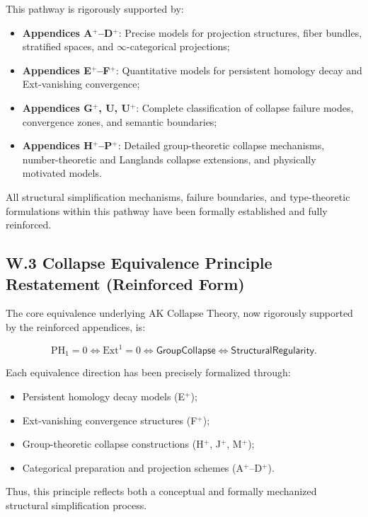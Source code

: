 \documentclass[11pt]{article}
\begin{document}
This pathway is rigorously supported by:

\begin{itemize}
    \item \textbf{Appendices A$^{+}$–D$^{+}$}: Precise models for projection structures, fiber bundles, stratified spaces, and $\infty$-categorical projections;
    \item \textbf{Appendices E$^{+}$–F$^{+}$}: Quantitative models for persistent homology decay and Ext-vanishing convergence;
    \item \textbf{Appendices G$^{+}$, U, U$^{+}$}: Complete classification of collapse failure modes, convergence zones, and semantic boundaries;
    \item \textbf{Appendices H$^{+}$–P$^{+}$}: Detailed group-theoretic collapse mechanisms, number-theoretic and Langlands collapse extensions, and physically motivated models.
\end{itemize}

All structural simplification mechanisms, failure boundaries, and type-theoretic formulations within this pathway have been formally established and fully reinforced.

\subsection*{W.3 Collapse Equivalence Principle Restatement (Reinforced Form)}

The core equivalence underlying AK Collapse Theory, now rigorously supported by the reinforced appendices, is:

\[
\mathrm{PH}_1 = 0 \iff \mathrm{Ext}^1 = 0 \iff \mathsf{GroupCollapse} \iff \mathsf{StructuralRegularity}.
\]

Each equivalence direction has been precisely formalized through:

\begin{itemize}
    \item Persistent homology decay models (E$^{+}$);
    \item Ext-vanishing convergence structures (F$^{+}$);
    \item Group-theoretic collapse constructions (H$^{+}$, J$^{+}$, M$^{+}$);
    \item Categorical preparation and projection schemes (A$^{+}$–D$^{+}$).
\end{itemize}

Thus, this principle reflects both a conceptual and formally mechanized structural simplification process.
\end{document}
